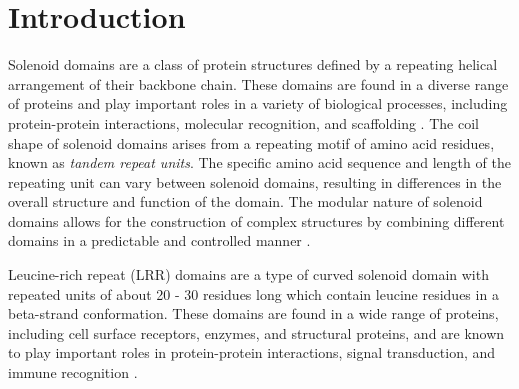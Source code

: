 \documentclass[authoryear]{article}
\begin{document}
\section*{Introduction}

Solenoid domains are a class of protein structures defined by a repeating helical arrangement of their backbone chain. These domains are found in a diverse range of proteins and play important roles in a variety of biological processes, including protein-protein interactions, molecular recognition, and scaffolding \cite{jang2021leucine}. The coil shape of solenoid domains arises from a repeating motif of amino acid residues, known as \emph{tandem repeat units}. The specific amino acid sequence and length of the repeating unit can vary between solenoid domains, resulting in differences in the overall structure and function of the domain. The modular nature of solenoid domains allows for the construction of complex structures by combining different domains in a predictable and controlled manner \cite{park2015control}.



Leucine-rich repeat (LRR) domains are a type of curved solenoid domain with repeated units of about 20 - 30 residues long which contain leucine residues in a beta-strand conformation. These domains are found in a wide range of proteins, including cell surface receptors, enzymes, and structural proteins, and are known to play important roles in protein-protein interactions, signal transduction, and immune recognition \cite{ng2011leucine}.
\end{document}
